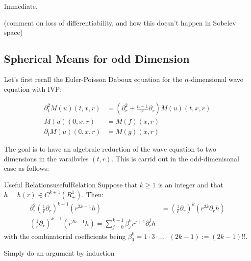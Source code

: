 \documentclass{book}
\newenvironment{Proof}[1][]
  {\begin{ProofTcb}[#1]}
  {\end{ProofTcb}}
\begin{document}
\begin{Proof}
	Immediate.
\end{Proof}

(comment on loss of differentiability, and how this doesn't happen in Sobelev space)

\subsection{Spherical Means for odd Dimension}
Let's first recall the Euler-Poisson Daboux equation for the $n$-dimensional wave equation with IVP:


\begin{align*}
	 \partial_t^2 M(u)(t,x,r) &= \left(  \partial_r^2 + \frac{n-1}{r}  \partial_r \right) M(u)(t,x,r)\\
	 M(u)(0,x,r) &= M(f)(x,r)\\
	  \partial_t M(u)(0,x,r) &= M(g)(x,r)
\end{align*}

The goal is to have an algebraic reduction of the wave equation to two dimensions in the varaibvles $(t,r)$. This is
carrid out in the odd-dimenisonal case as follows:

\begin{lem}{Useful Relations}{usefulRelation}
	Suppose that $k \ge 1$ is an integer and that $h = h(r) \in C^{k+1}(R_+^1)$. Then:
	\begin{align*}
		\partial_r^2 \left( \frac{1}{r}  \partial_r \right)^{k-1} \left( r^{2k-1} h \right) &= \left(  \frac{1}{r}
		\partial_r \right)^k  \left( r^{2k}  \partial_r h \right)\\
		\left(  \frac{1}{r}  \partial_r \right)^{k-1} \left( r^{2k-1} h \right) = \sum_{j=0}^{k-1} \beta_j^k r^{j+1}
		\partial_r^jh
	\end{align*}
	with the combinatorial coefficients being $\beta_0^k = 1\cdot 3\cdot ... \cdot (2k-1) := (2k-1)!!$.
\end{lem}

\begin{Proof}
	Simply do an argument by induction
\end{Proof}
\end{document}
